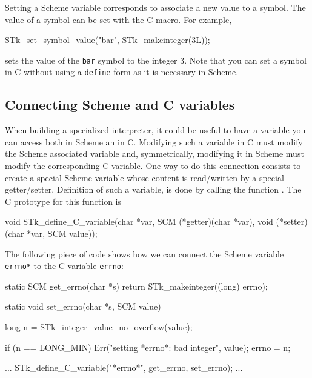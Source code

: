 \documentclass[10pt]{article}
\begin{document}
\begin{Lentry}
\item[Setting a variable]
Setting a Scheme variable corresponds to associate a new value to a symbol. The
value of a symbol can be set with the  C macro.
For example, 
\begin{Code}
\begin{listing}[200]{2}
STk_set_symbol_value("bar", STk_makeinteger(3L));
\end{listing}
\end{Code}
sets the value of the {\tt bar} symbol to the integer 3. Note that you can set a
symbol in C without using a {\tt define} form as it is necessary in Scheme.
\end{Lentry}

\subsection{Connecting Scheme and C variables}

When building a specialized interpreter, it could be useful to have a variable
you can access both in Scheme an in C. Modifying such a variable in C must
modify the Scheme associated variable and, symmetrically, modifying it in Scheme
must modify the corresponding C variable. One way to do this connection consists
to create a special Scheme variable whose content is read/written by a special
getter/setter. Definition of such a variable, is done by calling the function
. The C prototype for this function is
\begin{Code}
\begin{listing}[200]{2}
void STk_define_C_variable(char *var, 
                           SCM  (*getter)(char *var), 
                           void (*setter)(char *var, SCM value));
\end{listing}
\end{Code}

The following piece of code shows how we can connect the Scheme variable {\tt *errno*} to the C
variable {\tt errno}:

\begin{Code}
\begin{listing}[200]{2}
static SCM get_errno(char *s)
{
  return STk_makeinteger((long) errno);
}
\end{listing}
\end{Code}
\begin{Code}
\begin{listing}[200]{2}
static void set_errno(char *s, SCM value)
{
  long n = STk_integer_value_no_overflow(value);

  if (n == LONG_MIN) Err("setting *errno*: bad integer", value);
  errno = n;
}
\end{listing}
\end{Code}
\begin{Code}
\begin{listing}[200]{2}
{
  ...
  STk_define_C_variable("*errno*", get_errno, set_errno);
  ...
}
\end{listing}
\end{Code}
\end{document}
